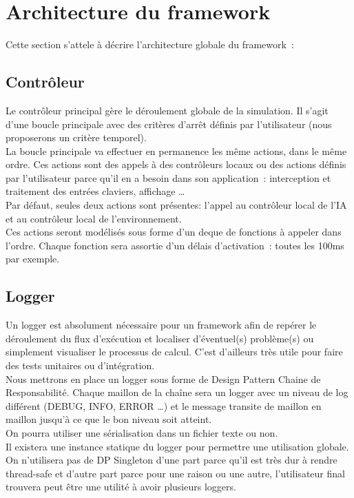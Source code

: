 \section{Architecture du framework}

Cette section s'attele à décrire l'architecture globale du framework~:

\subsection{Contrôleur}

Le contrôleur principal gère le déroulement globale de la simulation. Il s'agit d'une boucle principale avec des critères d'arrêt définis par l'utilisateur (nous proposerons un critère temporel).\\
\indent La boucle principale va effectuer en permanence les même actions, dans le même ordre. Ces actions sont des appels à des contrôleurs locaux ou des actions définis par l'utilisateur parce qu'il en a besoin dans son application~: interception et traitement des entrées claviers, affichage \ldots \\
\indent Par défaut, seules deux actions sont présentes: l'appel au contrôleur local de l'IA et au contrôleur local de l'environnement.\\

Ces actions seront modélisés sous forme d'un deque de fonctions à appeler dans l'ordre. Chaque fonction sera assortie d'un délais d'activation~: toutes les 100ms par exemple.

\subsection{Logger}
Un logger est absolument nécessaire pour un framework afin de repérer le déroulement du flux d'exécution et localiser d'éventuel(s) problème(s) ou simplement visualiser le processus de calcul. C'est d'ailleurs très utile pour faire des tests unitaires ou d'intégration.\\
\indent Nous mettrons en place un logger sous forme de Design Pattern Chaine de Responsabilité. Chaque maillon de la chaîne sera un logger avec un niveau de log différent (DEBUG, INFO, ERROR \ldots ) et le message transite de maillon en maillon jusqu'à ce que le bon niveau soit atteint.\\
\indent On pourra utiliser une sérialisation dans un fichier texte ou non.\\

Il existera une instance statique du logger pour permettre une utilisation globale. On n'utilisera pas de DP Singleton d'une part parce qu'il est très dur à rendre thread-safe et d'autre part parce pour une raison ou une autre, l'utilisateur final trouvera peut être une utilité à avoir plusieurs loggers.

